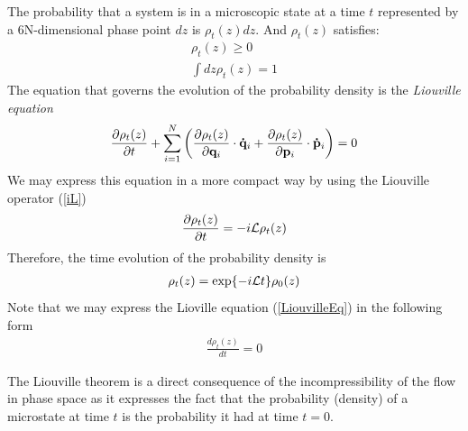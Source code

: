 \documentclass[b5paper,openright,10pt]{book}
\begin{document}
The probability that a system is in a microscopic state at a time $t$ represented by a 6N-dimensional phase point $dz$ is $\rho_t(z)dz$. And $\rho_t(z)$ satisfies:
%
\begin{align}
    \rho_t(z) \geq 0  \nonumber \\
    \int dz\rho_t(z) = 1
\end{align}
%
The equation that governs the evolution of the probability density is the {\it Liouville equation}
\begin{align}
    \frac{\partial\rho_t(z)}{\partial t} + \sum_{i=1}^N\left(\frac{\partial\rho_t(z)}{\partial{\bf q}_i}\cdot{\bf \dot{q}}_i+\frac{\partial\rho_t(z)}{\partial{\bf p}_i}\cdot{\bf \dot{p}}_i\right) = 0
\end{align}
We may express this equation in a more compact way by using the Liouville operator (\ref{iL}) 
\begin{align}
    \frac{\partial\rho_t(z)}{\partial t} = -i{\cal L}\rho_t(z)
    \label{LiouvilleEq}
  \end{align}
Therefore, the time evolution of the probability density is
\begin{align}
    \rho_t(z) = {\rm exp}\{-i{\cal L}t\}\rho_0(z)
    \label{rhot}
\end{align}
Note that we may express the Lioville equation (\ref{LiouvilleEq}) in the following form
\begin{align}
    \frac{d\rho_t(z)}{dt} = 0 
    \label{LiouvilleTh}
\end{align}

The Liouville theorem is a direct consequence of the incompressibility of the flow in phase space as it expresses the fact that the probability (density) of a microstate at time $t$ is the probability it had at time $t=0$.
\end{document}
